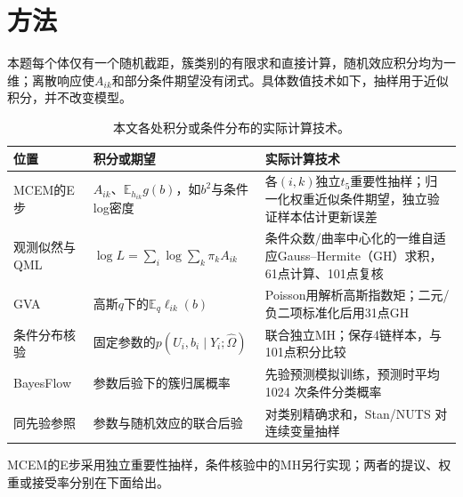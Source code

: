 \documentclass[UTF8,a4paper,11pt,fontset=fandol]{ctexart}
\newcommand{\E}{\mathbb E}\newcommand{\N}{\mathcal N}\newcommand{\KL}{\operatorname{KL}}
\begin{document}
\section{方法}
本题每个体仅有一个随机截距，簇类别的有限求和直接计算，随机效应积分均为一维；离散响应使$A_{ik}$和部分条件期望没有闭式。具体数值技术如下，抽样用于近似积分，并不改变模型。
\begin{table}[H]\centering\small
\caption{本文各处积分或条件分布的实际计算技术。}\begin{tabular}{p{.18\linewidth}p{.27\linewidth}p{.43\linewidth}}\toprule
位置 & 积分或期望 & 实际计算技术\\\midrule
MCEM的E步 & $A_{ik}$、$\E_{h_{ik}}g(b)$，如$b^2$与条件log密度 & 各$(i,k)$独立$t_5$重要性抽样；归一化权重近似条件期望，独立验证样本估计更新误差\\
观测似然与QML & $\log L=\sum_i\log\sum_k\pi_kA_{ik}$ & 条件众数/曲率中心化的一维自适应Gauss--Hermite（GH）求积，61点计算、101点复核\\
GVA & 高斯$q$下的$\E_q\ell_{ik}(b)$ & Poisson用解析高斯指数矩；二元/负二项标准化后用31点GH\\
条件分布核验 & 固定参数的$p(U_i,b_i\mid Y_i;\widehat\Omega)$ & 联合独立MH；保存4链样本，与101点积分比较\\
BayesFlow & 参数后验下的簇归属概率 & 先验预测模拟训练，预测时平均 1024 次条件分类概率\\
同先验参照 & 参数与随机效应的联合后验 & 对类别精确求和，Stan/NUTS 对连续变量抽样\\\bottomrule
\end{tabular}\end{table}
MCEM的E步采用独立重要性抽样，条件核验中的MH另行实现；两者的提议、权重或接受率分别在下面给出。
\end{document}
